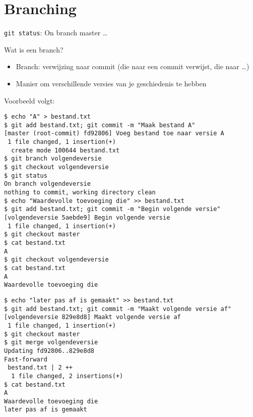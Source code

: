 \section{Branching}

\begin{frame}
	\texttt{git status}: On branch master \ldots
\end{frame}

\begin{frame}{Wat is een branch?}
	\begin{itemize}
		\item Branch: verwijzing naar commit (die naar een commit verwijst, die naar \ldots)
		\item Manier om verschillende versies van je geschiedenis te hebben
	\end{itemize}
	Voorbeeld volgt:
\end{frame}

\begin{frame}[fragile]
	\begin{verbatim}
$ echo "A" > bestand.txt
$ git add bestand.txt; git commit -m "Maak bestand A"
[master (root-commit) fd92806] Voeg bestand toe naar versie A
 1 file changed, 1 insertion(+)
  create mode 100644 bestand.txt
$ git branch volgendeversie
$ git checkout volgendeversie
$ git status
On branch volgendeversie
nothing to commit, working directory clean
$ echo "Waardevolle toevoeging die" >> bestand.txt
$ git add bestand.txt; git commit -m "Begin volgende versie"
[volgendeversie 5aebde9] Begin volgende versie
 1 file changed, 1 insertion(+)
$ git checkout master
$ cat bestand.txt
A
$ git checkout volgendeversie
$ cat bestand.txt
A
Waardevolle toevoeging die
	\end{verbatim}
\end{frame}

\begin{frame}[fragile]
	\begin{verbatim}
$ echo "later pas af is gemaakt" >> bestand.txt
$ git add bestand.txt; git commit -m "Maakt volgende versie af"
[volgendeversie 829e8d8] Maakt volgende versie af
 1 file changed, 1 insertion(+)
$ git checkout master
$ git merge volgendeversie
Updating fd92806..829e8d8
Fast-forward
 bestand.txt | 2 ++
  1 file changed, 2 insertions(+)
$ cat bestand.txt
A
Waardevolle toevoeging die
later pas af is gemaakt
	\end{verbatim}
\end{frame}

